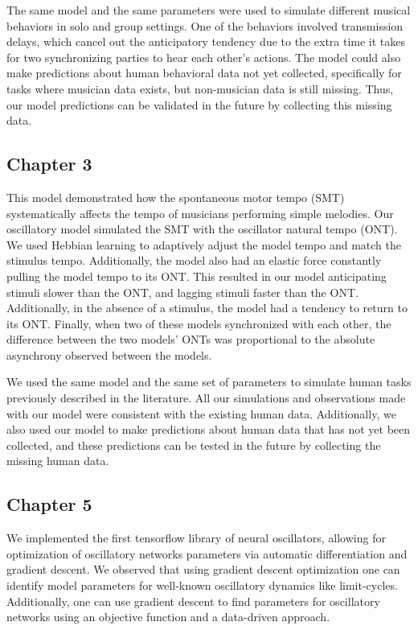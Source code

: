 \documentclass{report}
\begin{document}
The same model and the same parameters were used to simulate different musical behaviors in solo and group settings. One of the behaviors involved transmission delays, which cancel out the anticipatory tendency due to the extra time it takes for two synchronizing parties to hear each other's actions. The model could also make predictions about human behavioral data not yet collected, specifically for tasks where musician data exists, but non-musician data is still missing. Thus, our model predictions can be validated in the future by collecting this missing data.

\subsection{Chapter 3}
This model demonstrated how the spontaneous motor tempo (SMT) systematically affects the tempo of musicians performing simple melodies. Our oscillatory model simulated the SMT with the oscillator natural tempo (ONT). We used Hebbian learning to adaptively adjust the model tempo and match the stimulus tempo. Additionally, the model also had an elastic force constantly pulling the model tempo to its ONT. This resulted in our model anticipating stimuli slower than the ONT, and lagging stimuli faster than the ONT. Additionally, in the absence of a stimulus, the model had a tendency to return to its ONT. Finally, when two of these models synchronized with each other, the difference between the two models' ONTs was proportional to the absolute asynchrony observed between the models.

We used the same model and the same set of parameters to simulate human tasks previously described in the literature. All our simulations and observations made with our model were consistent with the existing human data. Additionally, we also used our model to make predictions about human data that has not yet been collected, and these predictions can be tested in the future by collecting the missing human data.
    
\subsection{Chapter 5}
We implemented the first tensorflow library of neural oscillators, allowing for optimization of oscillatory networks parameters via automatic differentiation and gradient descent. We observed that using gradient descent optimization one can identify model parameters for well-known oscillatory dynamics like limit-cycles. Additionally, one can use gradient descent to find parameters for oscillatory networks using an objective function and a data-driven approach.
\end{document}
